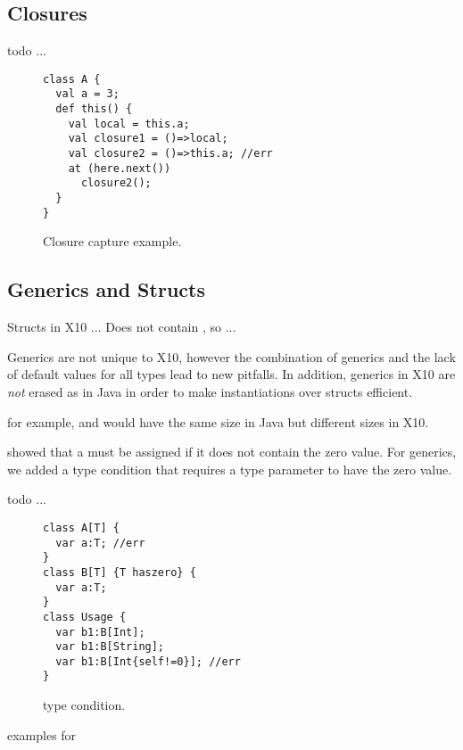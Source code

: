 \subsection{Closures}



 todo ...

\begin{figure}
\begin{lstlisting}
class A {
  val a = 3;
  def this() {
    val local = this.a;
    val closure1 = ()=>local;
    val closure2 = ()=>this.a; //err
    at (here.next())
      closure2();
  }
}
\end{lstlisting}
\caption{Closure capture \this example.
    }
\label{Figure:Closures}
\end{figure}



\subsection{Generics and Structs}
\label{Section:Generics-and-Structs}
Structs in X10 ...
Does not contain , so  ...

Generics are not unique to X10,
    however the combination of generics and the lack of default values for all types
    lead to new pitfalls.
In addition, generics in X10 are \emph{not} erased as in Java
    in order to make instantiations over structs efficient.

for example,  and 
    would have the same size in Java but different sizes in X10.

 showed that a  must be assigned if
    it does not contain the zero value.
For generics, we added a  type condition that requires a type parameter to have the zero value.


 todo ...

\begin{figure}
\begin{lstlisting}
class A[T] {
  var a:T; //err
}
class B[T] {T haszero} {
  var a:T;
}
class Usage {
  var b1:B[Int];
  var b1:B[String];
  var b1:B[Int{self!=0}]; //err
}
\end{lstlisting}
\caption{ type condition.
    }
\label{Figure:Generics}
\end{figure}


examples for 

